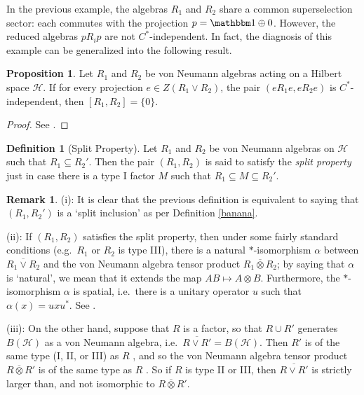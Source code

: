 \documentclass[11pt]{article}
\theoremstyle{definition}
\newtheorem{prop}[thm]{Proposition}
\theoremstyle{definition}
\newtheorem{defn}[thm]{Definition}
\newtheorem{rema}[thm]{Remark}
\theoremstyle{remark}
\def\2#1{{\mathcal #1}}
\def\8#1{{\mathbbm #1}}
\def\ol#1{{\overline #1}}
\def\a{\alpha} \def\b{\beta} \def\g{\gamma} \def\d{\delta}
\begin{document}
In the previous example, the algebras $R_1$ and $R_2$ share a common
superselection sector: each commutes with the projection $p=\81 \oplus
0$.  However, the reduced algebras $pR_ip$ are not $C^*$-independent.
In fact, the diagnosis of this example can be generalized into the
following result.

\begin{prop} Let $R_1$ and $R_2$ be von Neumann algebras acting on a
  Hilbert space $\2H$.  If for every projection $e\in Z(R_1\vee R_2
  )$, the pair $(eR_1e,eR_2e)$ is $C^*$-independent, then
  $[R_1,R_2]=\{ 0\}$.
\end{prop}

\begin{proof} See \cite{sumbuc}. \end{proof}

\begin{defn}[Split Property] Let $R_ 1$ and $R_2$ be von Neumann
  algebras on $\2H$ such that $R_1\subseteq R_2'$.  Then the pair
  $(R_1,R_2)$ is said to satisfy the \emph{split property} just in
  case there is a type I factor $M$ such that $R_1\subseteq M\subseteq
  R_2'$.  \end{defn}

\begin{rema} (i): It is clear that the previous
  definition is equivalent to saying that $(R_1,R_2')$
  is a `split inclusion' as per Definition
  \ref{banana}.

  (ii): If $(R_1,R_2)$ satisfies the split property,
  then under some fairly standard conditions (e.g.\
  $R_1$ or $R_2$ is type III), there is a natural
  $*$-isomorphism $\a$ between $\overline{R_1\vee R_2}$
  and the von Neumann algebra tensor product
  $R_1\overline{\otimes}R_2$; by saying that $\a$ is
  `natural', we mean that it extends the map $AB\mapsto
  A\otimes B$.  Furthermore, the $*$-isomorphism $\a$
  is spatial, i.e.\ there is a unitary operator $u$
  such that $\a (x)=uxu^*$.  See \cite[p.\ 212]{sum}.

  (iii): On the other hand, suppose that $R$ is a factor, so that
  $R\cup R'$ generates $B(\2H )$ as a von Neumann algebra, i.e.\
  $\overline{R\vee R'}=B(\2H )$.  Then $R'$ is of the same type (I,
  II, or III) as $R$ \cite[Thm.\ 9.1.3]{kr}, and so the von Neumann
  algebra tensor product $R\ol \otimes R'$ is of the same type as $R$
  \cite[p.\ 830]{kr}.  So if $R$ is type II or III, then
  $\overline{R\vee R'}$ is strictly larger than, and not isomorphic to
  $R\ol \otimes R'$.
\end{rema}
\end{document}
